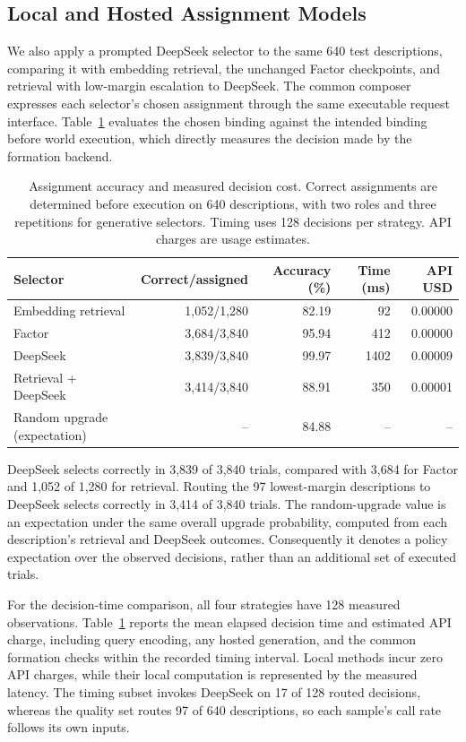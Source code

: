 \documentclass[sigconf,nonacm,balance=false]{aamas}
\newcommand{\tabstyle}{\small\setlength{\tabcolsep}{3pt}\renewcommand{\arraystretch}{1.10}}
\begin{document}
\FloatBarrier

\subsection{Local and Hosted Assignment Models}
\label{sec:supp-selector-comparison}
We also apply a prompted DeepSeek selector to the same 640 test descriptions, comparing it with embedding retrieval, the unchanged Factor checkpoints, and retrieval with low-margin escalation to DeepSeek. The common composer expresses each selector's chosen assignment through the same executable request interface. Table~\ref{tab:assignment-comparison} evaluates the chosen binding against the intended binding before world execution, which directly measures the decision made by the formation backend.

\begin{table}[!htbp]
\centering\tabstyle
\caption{Assignment accuracy and measured decision cost. Correct assignments are determined before execution on 640 descriptions, with two roles and three repetitions for generative selectors. Timing uses 128 decisions per strategy. API charges are usage estimates.}
\label{tab:assignment-comparison}
\begin{tabular}{@{}lrrrr@{}}\toprule
Selector & Correct/assigned & Accuracy (\%) & Time (ms) & API USD\\\midrule
Embedding retrieval & 1,052/1,280 & 82.19 & 92 & 0.00000\\
Factor & 3,684/3,840 & 95.94 & 412 & 0.00000\\
DeepSeek & 3,839/3,840 & 99.97 & 1402 & 0.00009\\
Retrieval + DeepSeek & 3,414/3,840 & 88.91 & 350 & 0.00001\\
Random upgrade (expectation) & -- & 84.88 & -- & --\\\bottomrule
\end{tabular}
\end{table}

DeepSeek selects correctly in 3,839 of 3,840 trials, compared with 3,684 for Factor and 1,052 of 1,280 for retrieval. Routing the 97 lowest-margin descriptions to DeepSeek selects correctly in 3,414 of 3,840 trials. The random-upgrade value is an expectation under the same overall upgrade probability, computed from each description's retrieval and DeepSeek outcomes. Consequently it denotes a policy expectation over the observed decisions, rather than an additional set of executed trials.

For the decision-time comparison, all four strategies have 128 measured observations. Table~\ref{tab:assignment-comparison} reports the mean elapsed decision time and estimated API charge, including query encoding, any hosted generation, and the common formation checks within the recorded timing interval. Local methods incur zero API charges, while their local computation is represented by the measured latency. The timing subset invokes DeepSeek on 17 of 128 routed decisions, whereas the quality set routes 97 of 640 descriptions, so each sample's call rate follows its own inputs.
\end{document}
